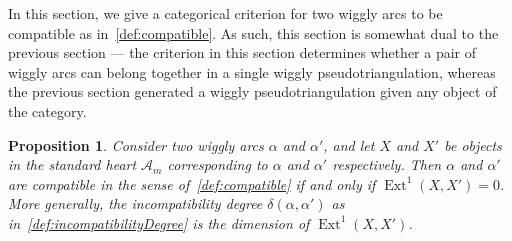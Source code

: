 \documentclass{amsart}
\newtheorem{proposition}[theorem]{Proposition}
\theoremstyle{definition}
\DeclareMathOperator{\Ext}{Ext} %
\begin{document}
In this section, we give a categorical criterion for two wiggly arcs to be compatible as in~\cref{def:compatible}.
As such, this section is somewhat dual to the previous section --- the criterion in this section determines whether a pair of wiggly arcs can belong together in a single wiggly pseudotriangulation, whereas the previous section generated a wiggly pseudotriangulation given any object of the category.
\begin{proposition}\label{prop:ext1}
  Consider two wiggly arcs \(\alpha\) and \(\alpha'\), and let \(X\) and \(X'\) be objects in the standard heart \(\mathcal{A}_m\) corresponding to \(\alpha\) and \(\alpha'\) respectively.
  Then \(\alpha\) and \(\alpha'\) are compatible in the sense of~\cref{def:compatible} if and only if \(\Ext^1(X, X') = 0\).
  More generally, the incompatibility degree \(\delta(\alpha,\alpha')\) as in~\cref{def:incompatibilityDegree} is the dimension of \(\Ext^1(X,X')\).
\end{proposition}
\end{document}
